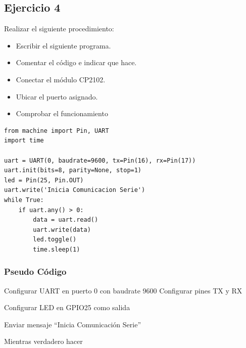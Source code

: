 \newpage
\subsection{Ejercicio 4}
Realizar el siguiente procedimiento:

\begin{itemize}
    \item [a.] Escribir el siguiente programa.
    \item [b.] Comentar el código e indicar que hace.
    \item [c.] Conectar el módulo CP2102.
    \item [d.] Ubicar el puerto asignado.
    \item [e.] Comprobar el funcionamiento
\end{itemize}

\begin{lstlisting}
from machine import Pin, UART
import time

uart = UART(0, baudrate=9600, tx=Pin(16), rx=Pin(17))
uart.init(bits=8, parity=None, stop=1)
led = Pin(25, Pin.OUT)
uart.write('Inicia Comunicacion Serie')
while True:
    if uart.any() > 0:
        data = uart.read()
        uart.write(data)
        led.toggle()
        time.sleep(1)
\end{lstlisting}
\subsubsection{Pseudo Código}

\begin{algorithm}[H]
\SetAlgoLined
\caption{Comunicación UART con control de LED}

Configurar UART en puerto 0 con baudrate 9600\;
Configurar pines TX y RX\;

Configurar LED en GPIO25 como salida\;

Enviar mensaje ``Inicia Comunicación Serie''\;

Mientras verdadero hacer\;
\Indp
\Indm

\end{algorithm}


